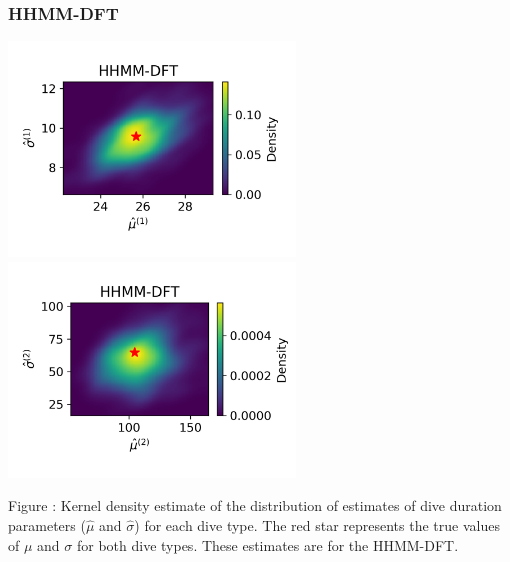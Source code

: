 \documentclass{article}
\begin{document}
        \subsubsection{HHMM-DFT}
        \begin{center}
        \includegraphics[width=3in]{../Plots/hhmm_FV_uncorr_MLE_density_dive_duration_-1_0.png}
        \includegraphics[width=3in]{../Plots/hhmm_FV_uncorr_MLE_density_dive_duration_-1_1.png}
        \end{center}

        \noindent Figure : Kernel density estimate of the distribution of estimates of dive duration parameters ($\hat \mu$ and $\hat \sigma$) for each dive type. The red star represents the true values of $\mu$ and $\sigma$ for both dive types. These estimates are for the HHMM-DFT.
        \addtocounter{fignum}{1}
        
\end{document}
